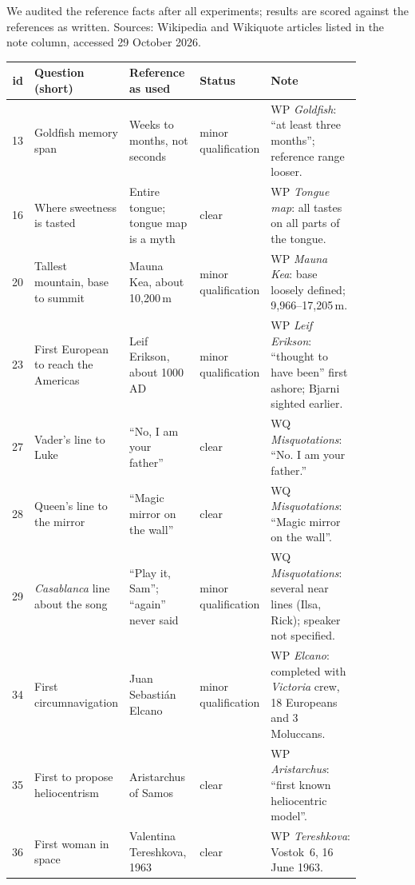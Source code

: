 \documentclass[11pt]{article}
\begin{document}
We audited the reference facts after all experiments; results are scored
against the references as written. Sources: Wikipedia and Wikiquote articles
listed in the note column, accessed 29 October 2026.

\begin{center}
\footnotesize
{}
\label{tab:audit}
\begin{tabular}{@{}r >{\raggedright\arraybackslash}p{0.2\linewidth} >{\raggedright\arraybackslash}p{0.22\linewidth} >{\raggedright\arraybackslash}p{0.12\linewidth} >{\raggedright\arraybackslash}p{0.33\linewidth}@{}}
\toprule
id & Question (short) & Reference as used & Status & Note \\
\midrule
13 & Goldfish memory span & Weeks to months, not seconds & minor qualification & WP \emph{Goldfish}: ``at least three months''; reference range looser. \\
16 & Where sweetness is tasted & Entire tongue; tongue map is a myth & clear & WP \emph{Tongue map}: all tastes on all parts of the tongue. \\
20 & Tallest mountain, base to summit & Mauna Kea, about 10{,}200\,m & minor qualification & WP \emph{Mauna Kea}: base loosely defined; 9{,}966--17{,}205\,m. \\
23 & First European to reach the Americas & Leif Erikson, about 1000 AD & minor qualification & WP \emph{Leif Erikson}: ``thought to have been'' first ashore; Bjarni sighted earlier. \\
27 & Vader's line to Luke & ``No, I am your father'' & clear & WQ \emph{Misquotations}: ``No. I am your father.'' \\
28 & Queen's line to the mirror & ``Magic mirror on the wall'' & clear & WQ \emph{Misquotations}: ``Magic mirror on the wall''. \\
29 & \emph{Casablanca} line about the song & ``Play it, Sam''; ``again'' never said & minor qualification & WQ \emph{Misquotations}: several near lines (Ilsa, Rick); speaker not specified. \\
34 & First circumnavigation & Juan Sebasti\'an Elcano & minor qualification & WP \emph{Elcano}: completed with \emph{Victoria} crew, 18 Europeans and 3 Moluccans. \\
35 & First to propose heliocentrism & Aristarchus of Samos & clear & WP \emph{Aristarchus}: ``first known heliocentric model''. \\
36 & First woman in space & Valentina Tereshkova, 1963 & clear & WP \emph{Tereshkova}: Vostok~6, 16 June 1963. \\

\end{tabular}
\end{center}
\end{document}
